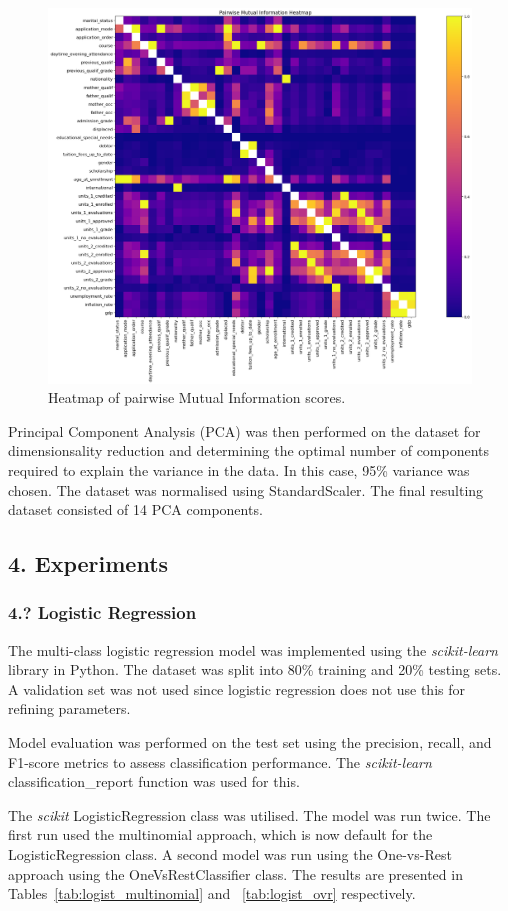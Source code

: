 \documentclass[12pt]{article}
\begin{document}
\begin{figure} [H]
    \centering
    \includegraphics[width=0.8\linewidth]{pairwise_mi}
    \caption{Heatmap of pairwise Mutual Information scores.}\label{fig:pairwise_mi}
  \end{figure}  

Principal Component Analysis (PCA) was then performed on the dataset for dimensionsality reduction and determining the optimal number of components required to explain the variance in the data. In this case, 95\% variance was chosen. The dataset was normalised using StandardScaler. The final resulting dataset consisted of 14 PCA components.

\newpage
\subsection*{4. Experiments}
\subsubsection*{4.? Logistic Regression}

The multi-class logistic regression model was implemented using the \textit{scikit-learn} library in Python. The dataset was split into 80\% training and 20\% testing sets. A validation set was not used since logistic regression does not use this for refining parameters.

Model evaluation was performed on the test set using the precision, recall, and F1-score metrics to assess classification performance. The \textit{scikit-learn} classification\_report function was used for this. 

The \textit{scikit} LogisticRegression class was utilised. The model was run twice. The first run used the multinomial approach, which is now default for the LogisticRegression class. A second model was run using the One-vs-Rest approach using the OneVsRestClassifier class. The results are presented in Tables~\ref{tab:logist_multinomial} and ~\ref{tab:logist_ovr} respectively. 
\end{document}
